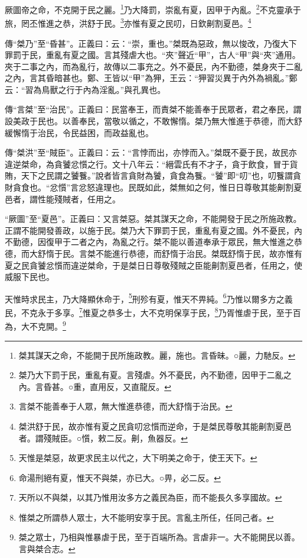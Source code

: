 厥圖帝之命，不克開于民之麗。\footnote{桀其謀天之命，不能開于民所施政教。麗，施也。言昏昧。○麗，力馳反。}乃大降罰，崇亂有夏，因甲于內亂。\footnote{桀乃大下罰于民，重亂有夏。言殘虐。外不憂民，內不勤德，因甲于二亂之內。言昏甚。○重，直用反，又直龍反。}不克靈承于旅，罔丕惟進之恭，洪舒于民。\footnote{言桀不能善奉于人眾，無大惟進恭德，而大舒惰于治民。}亦惟有夏之民叨，日欽劓割夏邑。\footnote{桀洪舒于民，故亦惟有夏之民貪叨忿懫而逆命，于是桀民尊敬其能劓割夏邑者。謂殘賊臣。○懫，敕二反。劓，魚器反。}


{\noindent\zhuan{}\fzbyks 傳“桀乃”至“昏甚”。正義曰：云：“崇，重也。”桀既為惡政，無以悛改，乃復大下罪罰于民，重亂有夏之國。言其殘虐大也。“夾”聲近“甲”，古人“甲”與“夾”通用。夾于二事之內，而為亂行，故傳以二事充之。外不憂民，內不勤德，桀身夾于二亂之內，言其昏暗甚也。鄭、王皆以“甲”為狎，王云：“狎習災異于內外為禍亂。”鄭云：“習為鳥獸之行于內為淫亂。”與孔異也。 \par}

{\noindent\zhuan{}\fzbyks 傳“言桀”至“治民”。正義曰：民當奉王，而責桀不能善奉于民眾者，君之奉民，謂設美政于民也。以善奉民，當敬以循之，不敢懈惰。桀乃無大惟進于恭德，而大舒緩懈惰于治民，令民益困，而政益亂也。 \par}

{\noindent\zhuan{}\fzbyks 傳“桀洪”至“賊臣”。正義曰：云：“言悖而出，亦悖而入。”桀既不憂于民，故民亦違逆桀命，為貪饕忿懫之行。文十八年云：“縉雲氏有不才子，貪于飲食，冒于貨賄，天下之民謂之饕餮。”說者皆言貪財為饕，貪食為餮。“饕”即“叨”也，叨餮謂貪財貪食也。“忿懫”言忿怒違理也。民既如此，桀無如之何，惟日日尊敬其能劓割夏邑者，謂性能殘賊者，任用之。 \par}

{\noindent\shu{}\fzkt “厥圖”至“夏邑”。正義曰：又言桀惡。桀其謀天之命，不能開發于民之所施政教。正謂不能開發善政，以施于民。桀乃大下罪罰于民，重亂有夏之國。外不憂民，內不勤德，因復甲于二者之內，為亂之行。桀不能以善道奉承于眾民，無大惟進之恭德，而大舒惰于民。言桀不能進行恭德，而舒惰于治民。桀既舒惰于民，故亦惟有夏之民貪饕忿懫而違逆桀命，于是桀日日尊敬殘賊之臣能劓割夏邑者，任用之，使威服下民也。 \par}

天惟時求民主，乃大降顯休命于，\footnote{天惟是桀惡，故更求民主以代之，大下明美之命于，使王天下。}刑殄有夏，惟天不畀純。\footnote{命湯刑絕有夏，惟天不與桀，亦已大。○畀，必二反。}乃惟以爾多方之義民，不克永于多享。\footnote{天所以不與桀，以其乃惟用汝多方之義民為臣，而不能長久多享國故。}惟夏之恭多士，大不克明保享于民，\footnote{惟桀之所謂恭人眾士，大不能明安享于民。言亂主所任，任同己者。}乃胥惟虐于民，至于百為，大不克開。\footnote{桀之眾士，乃相與惟暴虐于民，至于百端所為。言虐非一。大不能開民以善。言與桀合志。}


